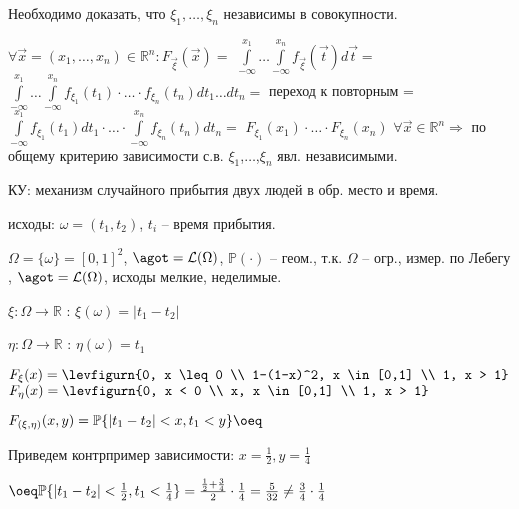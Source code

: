 \begin{proofs}
\begin{dokvo}
		Необходимо доказать, что $\xi_1, \ldots, \xi_n$ независимы в совокупности.

		$\forall \overrightarrow{x} = (x_1, \ldots, x_n) \in \mathbb{R}^n : F_{\overrightarrow{\xi}}(\overrightarrow{x}) = $
		$\int\limits_{-\infty}^{x_1} \ldots \int\limits_{-\infty}^{x_n} f_{\overrightarrow{\xi}}(\overrightarrow{t})d \overrightarrow{t} = $
		$\int\limits_{-\infty}^{x_1} \ldots \int\limits_{-\infty}^{x_n} f_{\xi_1}(t_1) \cdot \ldots \cdot f_{\xi_n}(t_n)dt_1 \ldots dt_n =$ переход к повторным =
		$\int\limits_{-\infty}^{x_1} f_{\xi_1}(t_1)dt_1 \cdot \ldots \cdot \int\limits_{-\infty}^{x_n} f_{\xi_n}(t_n)dt_n =$
		$F_{\xi_1}(x_1) \cdot \ldots \cdot F_{\xi_n}(x_n)$  $\forall \overrightarrow{x} \in \mathbb{R}^n  \Rightarrow$ по общему критерию зависимости с.в. $\xi_1$,$\dots$,$\xi_n$ явл. независимыми.
	\end{dokvo}
\end{proofs}

\begin{example}
	КУ: механизм случайного прибытия двух людей в обр. место и время.

	исходы: $\omega = (t_1,t_2)$, $t_i$ -- время прибытия.

	$\Omega = \{\omega\} = [0,1]^2$, $\agot = \mathcal{L}(\Omega)$,
	$\mathbb{P}(\cdot)$ -- геом., т.к. $\Omega$ -- огр., измер. по Лебегу
	, $\agot = \mathcal{L}(\Omega)$, исходы мелкие, неделимые.

	$\xi:\Omega \to \mathbb{R}$ : $\xi(\omega) = |t_1 - t_2|$

	$\eta:\Omega \to \mathbb{R}$ : $\eta(\omega) = t_1$

	$F_{\xi}(x) = \levfigurn{0, x \leq 0 \\ 1-(1-x)^2, x \in [0,1] \\ 1, x > 1}$
	$F_{\eta}(x) = \levfigurn{0, x < 0 \\ x, x \in [0,1] \\ 1, x > 1}$

	$F_{(\xi,\eta)}(x,y) = \mathbb{P}\{|t_1 - t_2| < x, t_1 < y\} \oeq$

	Приведем контрпример зависимости: $x = \frac{1}{2}, y = \frac{1}{4}$

	$\oeq \mathbb{P}\{|t_1 - t_2| < \frac{1}{2}, t_1 < \frac{1}{4}\} = \frac{\frac{1}{2} + \frac{3}{4}}{2} \cdot \frac{1}{4} = \frac{5}{32} \neq \frac{3}{4} \cdot \frac{1}{4}$
\end{example}
\newpage
